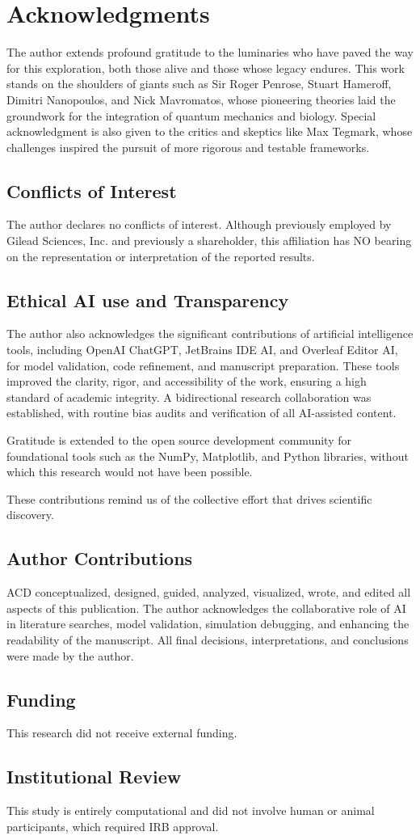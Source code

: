 \section{Acknowledgments} 
The author extends profound gratitude to the luminaries who have paved the way for this exploration, both those alive and those whose legacy endures. This work stands on the shoulders of giants such as Sir Roger Penrose, Stuart Hameroff, Dimitri Nanopoulos, and Nick Mavromatos, whose pioneering theories laid the groundwork for the integration of quantum mechanics and biology. Special acknowledgment is also given to the critics and skeptics like Max Tegmark, whose challenges inspired the pursuit of more rigorous and testable frameworks. 

\subsection{Conflicts of Interest} 
The author declares no conflicts of interest. Although previously employed by Gilead Sciences, Inc. and previously a shareholder, this affiliation has NO bearing on the representation or interpretation of the reported results.  

\subsection{Ethical AI use and Transparency} 
The author also acknowledges the significant contributions of artificial intelligence tools, including OpenAI ChatGPT, JetBrains IDE AI, and Overleaf Editor AI, for model validation, code refinement, and manuscript preparation. These tools improved the clarity, rigor, and accessibility of the work, ensuring a high standard of academic integrity. A bidirectional research collaboration was established, with routine bias audits and verification of all AI-assisted content.

Gratitude is extended to the open source development community for foundational tools such as the NumPy, Matplotlib, and Python libraries, without which this research would not have been possible. 

These contributions remind us of the collective effort that drives scientific discovery. 

\subsection{Author Contributions} 
ACD conceptualized, designed, guided, analyzed, visualized, wrote, and edited all aspects of this publication. The author acknowledges the collaborative role of AI in literature searches, model validation, simulation debugging, and enhancing the readability of the manuscript. All final decisions, interpretations, and conclusions were made by the author. 

\subsection{Funding} 
This research did not receive external funding. 

\subsection{Institutional Review} 
This study is entirely computational and did not involve human or animal participants, which required IRB approval. 


  
